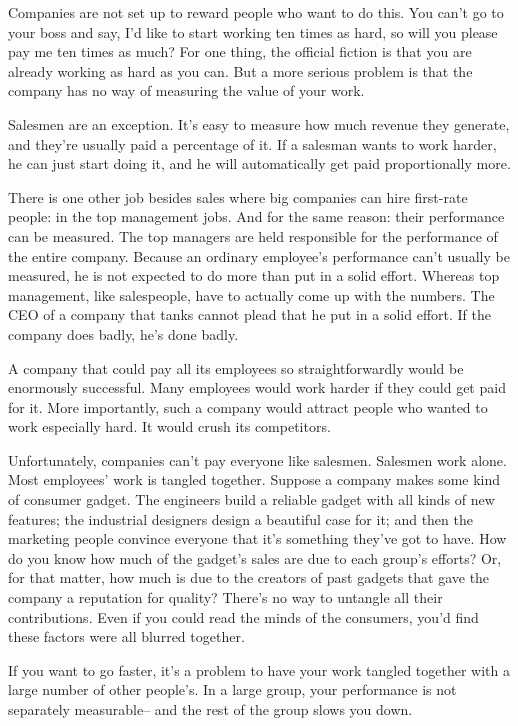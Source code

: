 \documentclass[12pt]{book}
\begin{document}
Companies are not set up to reward people who want to do this. You can't
go to your boss and say, I'd like to start working ten times as hard, so
will you please pay me ten times as much? For one thing, the official
fiction is that you are already working as hard as you can. But a more
serious problem is that the company has no way of measuring the value of
your work.

Salesmen are an exception. It's easy to measure how much revenue they
generate, and they're usually paid a percentage of it. If a salesman
wants to work harder, he can just start doing it, and he will
automatically get paid proportionally more.

There is one other job besides sales where big companies can hire
first-rate people: in the top management jobs. And for the same reason:
their performance can be measured. The top managers are held responsible
for the performance of the entire company. Because an ordinary
employee's performance can't usually be measured, he is not expected to
do more than put in a solid effort. Whereas top management, like
salespeople, have to actually come up with the numbers. The CEO of a
company that tanks cannot plead that he put in a solid effort. If the
company does badly, he's done badly.

A company that could pay all its employees so straightforwardly would be
enormously successful. Many employees would work harder if they could
get paid for it. More importantly, such a company would attract people
who wanted to work especially hard. It would crush its competitors.

Unfortunately, companies can't pay everyone like salesmen. Salesmen work
alone. Most employees' work is tangled together. Suppose a company makes
some kind of consumer gadget. The engineers build a reliable gadget with
all kinds of new features; the industrial designers design a beautiful
case for it; and then the marketing people convince everyone that it's
something they've got to have. How do you know how much of the gadget's
sales are due to each group's efforts? Or, for that matter, how much is
due to the creators of past gadgets that gave the company a reputation
for quality? There's no way to untangle all their contributions. Even if
you could read the minds of the consumers, you'd find these factors were
all blurred together.

If you want to go faster, it's a problem to have your work tangled
together with a large number of other people's. In a large group, your
performance is not separately measurable-- and the rest of the group
slows you down.
\end{document}
